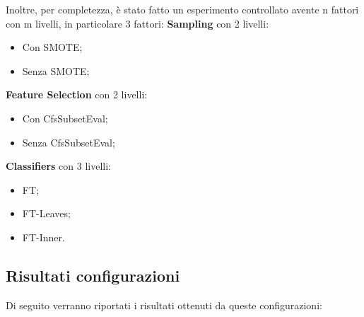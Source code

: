 Inoltre, per completezza, è stato fatto un esperimento controllato avente n fattori con m livelli, in particolare 3 fattori:
\textbf{Sampling} con 2 livelli:
\begin{itemize}
	\item Con SMOTE;
	\item Senza SMOTE;
\end{itemize}
\textbf{Feature Selection} con 2 livelli:
\begin{itemize}
	\item Con CfsSubsetEval;
	\item Senza CfsSubsetEval;
\end{itemize}
\textbf{Classifiers} con 3 livelli:
\begin{itemize}
	\item FT;
	\item FT-Leaves;
	\item FT-Inner.
\end{itemize}
\subsection{Risultati configurazioni}
Di seguito verranno riportati i risultati ottenuti da queste configurazioni: 

